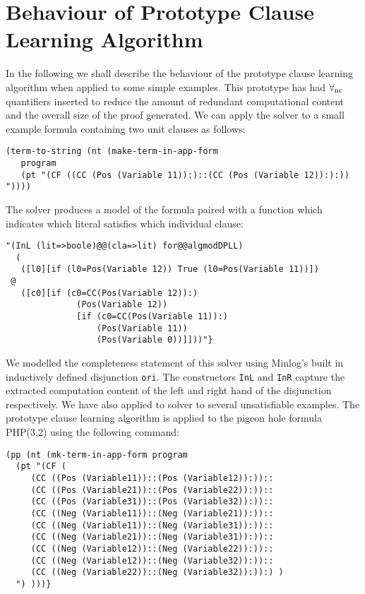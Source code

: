 \section{Behaviour of Prototype Clause Learning Algorithm}
In the following we shall describe the behaviour of the prototype clause learning algorithm when applied to some simple examples. This prototype has had $\forall_{\mathrm{nc}}$ quantifiers inserted to reduce the amount of redundant computational content and the overall size of the proof generated. We can apply the solver to a small example formula containing two unit clauses as follows:
\begin{lstlisting}
(term-to-string (nt (make-term-in-app-form 
   program 
   (pt "(CF ((CC (Pos (Variable 11)):)::(CC (Pos (Variable 12)):):)) 
"))))
\end{lstlisting}
The solver produces a model of the formula paired with a function which indicates which literal satisfies which individual clause:

\begin{lstlisting}
"(InL (lit=>boole)@@(cla=>lit) for@@algmodDPLL)
  (
   ([l0][if (l0=Pos(Variable 12)) True (l0=Pos(Variable 11))])
 @
   ([c0][if (c0=CC(Pos(Variable 12)):) 
              (Pos(Variable 12))
              [if (c0=CC(Pos(Variable 11)):) 
                  (Pos(Variable 11)) 
                  (Pos(Variable 0))]]))"}                                                                     
\end{lstlisting}

We modelled the completeness statement of this solver using Minlog's built in inductively defined disjunction \texttt{ori}. The constructors \texttt{InL} and \texttt{InR} capture the extracted computation content of the left and right hand of the disjunction respectively. We have also applied to solver to several unsatisfiable examples. The prototype clause learning algorithm is applied to the pigeon hole formula PHP(3,2) using the following command:

\begin{lstlisting}
(pp (nt (mk-term-in-app-form program 
  (pt "(CF (                                                                
     (CC ((Pos (Variable11))::(Pos (Variable12)):))::
     (CC ((Pos (Variable21))::(Pos (Variable22)):))::
     (CC ((Pos (Variable31))::(Pos (Variable32)):))::
     (CC ((Neg (Variable11))::(Neg (Variable21)):))::
     (CC ((Neg (Variable11))::(Neg (Variable31)):))::
     (CC ((Neg (Variable21))::(Neg (Variable31)):))::
     (CC ((Neg (Variable12))::(Neg (Variable22)):))::
     (CC ((Neg (Variable12))::(Neg (Variable32)):))::
     (CC ((Neg (Variable22))::(Neg (Variable32)):)):) )
  ") )))}
\end{lstlisting}

